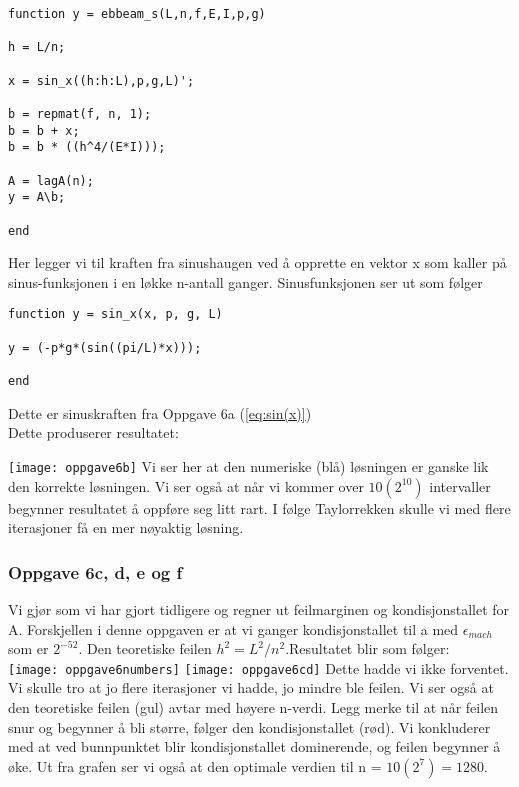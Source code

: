 \begin{lstlisting}
function y = ebbeam_s(L,n,f,E,I,p,g)

h = L/n;

x = sin_x((h:h:L),p,g,L)';

b = repmat(f, n, 1);
b = b + x;
b = b * ((h^4/(E*I)));

A = lagA(n);
y = A\b;

end
\end{lstlisting}

Her legger vi til kraften fra sinushaugen ved å opprette en vektor x som kaller på sinus-funksjonen i en løkke n-antall ganger. Sinusfunksjonen ser ut som følger

\begin{lstlisting}
function y = sin_x(x, p, g, L)

y = (-p*g*(sin((pi/L)*x)));

end
\end{lstlisting}

Dette er sinuskraften fra Oppgave 6a (\ref{eq:sin(x)})
\\Dette produserer resultatet:

\texttt{[image: oppgave6b]}
Vi ser her at den numeriske (blå) løsningen er ganske lik den korrekte løsningen. Vi ser også at når vi kommer over $10(2^{10})$ intervaller begynner resultatet å oppføre seg litt rart. I følge Taylorrekken skulle vi med flere iterasjoner få en mer nøyaktig løsning.

\subsubsection{Oppgave 6c, d, e og f}
Vi gjør som vi har gjort tidligere og regner ut feilmarginen og kondisjonstallet for A. Forskjellen i denne oppgaven er at vi ganger kondisjonstallet til a med $\epsilon_{mach}$ som er $2^{-52}$. Den teoretiske feilen $h^2 = L^2 / n^2$.Resultatet blir som følger:
\\
\texttt{[image: oppgave6numbers]}
\texttt{[image: oppgave6cd]}
Dette hadde vi ikke forventet. Vi skulle tro at jo flere iterasjoner vi hadde, jo mindre ble feilen. Vi ser også at den teoretiske feilen (gul) avtar med høyere n-verdi. Legg merke til at når feilen snur og begynner å bli større, følger den kondisjonstallet (rød). Vi konkluderer med at ved bunnpunktet blir kondisjonstallet dominerende, og feilen begynner å øke. Ut fra grafen ser vi også at den optimale verdien til n = $10(2^7) = 1280$.

